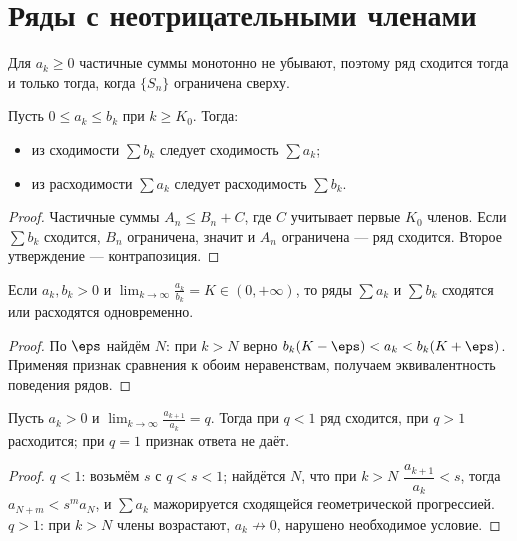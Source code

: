 \section{Ряды с неотрицательными членами}

Для $a_k\ge0$ частичные суммы монотонно не убывают, поэтому ряд сходится тогда и только тогда,
когда $\{S_n\}$ ограничена сверху.

\begin{theorem}
Пусть $0\le a_k\le b_k$ при $k\ge K_0$. Тогда:
\begin{itemize}[leftmargin=*]
  \item из сходимости $\sum b_k$ следует сходимость $\sum a_k$;
  \item из расходимости $\sum a_k$ следует расходимость $\sum b_k$.
\end{itemize}
\end{theorem}

\begin{proof}
Частичные суммы $A_n\le B_n+C$, где $C$ учитывает первые $K_0$ членов. Если $\sum b_k$ сходится,
$B_n$ ограничена, значит и $A_n$ ограничена — ряд сходится. Второе утверждение — контрапозиция.
\end{proof}

\begin{theorem}
Если $a_k,b_k>0$ и $\displaystyle\lim_{k\to\infty}\frac{a_k}{b_k}=K\in(0,+\infty)$, то ряды
$\sum a_k$ и $\sum b_k$ сходятся или расходятся одновременно.
\end{theorem}

\begin{proof}
По $\eps$ найдём $N$: при $k>N$ верно $b_k(K-\eps)<a_k<b_k(K+\eps)$. Применяя признак сравнения к
обоим неравенствам, получаем эквивалентность поведения рядов.
\end{proof}

\begin{theorem}
Пусть $a_k>0$ и $\displaystyle\lim_{k\to\infty}\frac{a_{k+1}}{a_k}=q$. Тогда при $q<1$ ряд
сходится, при $q>1$ расходится; при $q=1$ признак ответа не даёт.
\end{theorem}

\begin{proof}
$q<1$: возьмём $s$ с $q<s<1$; найдётся $N$, что при $k>N$ $\dfrac{a_{k+1}}{a_k}<s$, тогда
$a_{N+m}<s^m a_N$, и $\sum a_k$ мажорируется сходящейся геометрической прогрессией. $q>1$: при
$k>N$ члены возрастают, $a_k\not\to0$, нарушено необходимое условие.
\end{proof}

